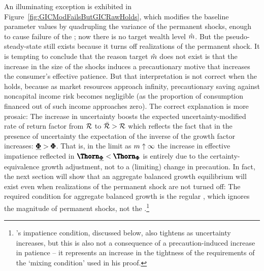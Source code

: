 \documentclass[BufferStockTheory]{subfiles}
\begin{document}
An illuminating exception is exhibited in Figure~\ref{fig:GICModFailsButGICRawHolds}, which modifies the baseline parameter values by quadrupling the variance of the permanent shocks, enough to cause failure of the \GICMod; now there is no target wealth level $\hat{m}$.  But the pseudo-steady-state still exists because it turns off realizations of the permanent shock.  It is tempting to conclude that the reason target $\hat{m}$ does not exist is that the increase in the size of the shocks induces a precautionary motive that increases the consumer's effective patience.  But that interpretation is not correct when the {\FHWC} holds, because as market resources approach infinity, precautionary saving against noncapital income risk becomes negligible (as the proportion of consumption financed out of such income approaches zero).  The correct explanation is more prosaic: The increase in uncertainty boosts the expected uncertainty-modified rate of return factor from $\mathcal{R}$ to $\bar{\mathcal{R}}>\mathcal{R}$ which reflects the fact that in the presence of uncertainty the expectation of the inverse of the growth factor increases: $\underline{\pmb{\Phi}} > \pmb{\Phi}$.  That is, in the limit as $m \uparrow \infty$ the increase in effective impatience reflected in $\GPFacNrm < \GPFacRaw$ is entirely due to the certainty-equivalence growth adjustment, not to a (limiting) change in precaution.  In fact, the next section will show that an aggregate balanced growth equilibrium will exist even when realizations of the permanent shock are not turned off: The required condition for aggregate balanced growth is the regular {\GICRaw}, which ignores the magnitude of permanent shocks, not the {\GICMod}.\footnote{\cite{szeidlInvariant}'s impatience condition, discussed below, also tightens as uncertainty increases, but this is also not a consequence of a precaution-induced increase in patience -- it represents an increase in the tightness of the requirements of the `mixing condition' used in his proof.}
\end{document}
